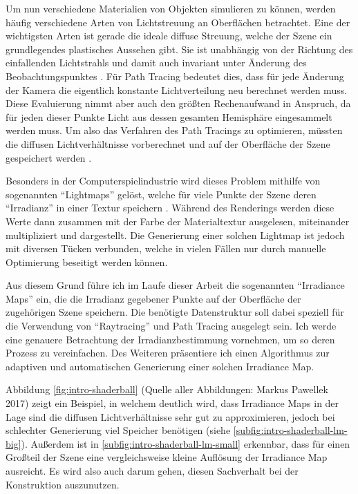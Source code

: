 	Um nun verschiedene Materialien von Objekten simulieren zu können, werden häufig verschiedene Arten von Lichtstreuung an Oberflächen betrachtet.
	Eine der wichtigsten Arten ist gerade die ideale diffuse Streuung, welche der Szene ein grundlegendes plastisches Aussehen gibt.
	Sie ist unabhängig von der Richtung des einfallenden Lichtstrahls und damit auch invariant unter Änderung des Beobachtungspunktes \cite{intro-radiometry}.
	Für Path Tracing bedeutet dies, dass für jede Änderung der Kamera die eigentlich konstante Lichtverteilung neu berechnet werden muss.
	Diese Evaluierung nimmt aber auch den größten Rechenaufwand in Anspruch, da für jeden dieser Punkte Licht aus dessen gesamten Hemisphäre eingesammelt werden muss.
	Um also das Verfahren des Path Tracings zu optimieren, müssten die diffusen Lichtverhältnisse vorberechnet und auf der Oberfläche der Szene gespeichert werden \cite{irradiance-caching}.

	Besonders in der Computerspielindustrie wird dieses Problem mithilfe von sogenannten \enquote{Lightmaps} gelöst, welche für viele Punkte der Szene deren \enquote{Irradianz} in einer Textur speichern \cite{tricks-game}.
	Während des Renderings werden diese Werte dann zusammen mit der Farbe der Materialtextur ausgelesen, miteinander multipliziert und dargestellt.
	Die Generierung einer solchen Lightmap ist jedoch mit diversen Tücken verbunden, welche in vielen Fällen nur durch manuelle Optimierung beseitigt werden können.

	Aus diesem Grund führe ich im Laufe dieser Arbeit die sogenannten \enquote{Irradiance Maps} ein, die die Irradianz gegebener Punkte auf der Oberfläche der zugehörigen Szene speichern.
	Die benötigte Datenstruktur soll dabei speziell für die Verwendung von \enquote{Raytracing} und Path Tracing ausgelegt sein.
	Ich werde eine genauere Betrachtung der Irradianzbestimmung vornehmen, um so deren Prozess zu vereinfachen.
	Des Weiteren präsentiere ich einen Algorithmus zur adaptiven und automatischen Generierung einer solchen Irradiance Map.

	Abbildung \ref{fig:intro-shaderball} (Quelle aller Abbildungen: Markus Pawellek 2017) zeigt ein Beispiel, in welchem deutlich wird, dass Irradiance Maps in der Lage sind die diffusen Lichtverhältnisse sehr gut zu approximieren, jedoch bei schlechter Generierung viel Speicher benötigen (siehe \ref{subfig:intro-shaderball-lm-big}).
	Außerdem ist in \ref{subfig:intro-shaderball-lm-small} erkennbar, dass für einen Großteil der Szene eine vergleichsweise kleine Auflösung der Irradiance Map ausreicht.
	Es wird also auch darum gehen, diesen Sachverhalt bei der Konstruktion auszunutzen.

